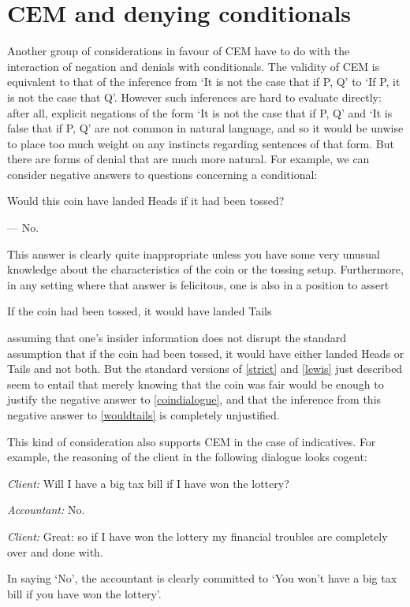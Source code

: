 \documentclass[If.tex]{subfiles}
\begin{document}
\section{CEM and denying conditionals}
Another group of considerations in favour of CEM have to do with the interaction of negation and denials with conditionals. The validity of CEM is equivalent to that of the inference from ‘It is not the case that if P, Q’ to ‘If P, it is not the case that Q’. However such inferences are hard to evaluate directly: after all, explicit negations of the form ‘It is not the case that if P, Q’ and ‘It is false that if P, Q’ are not common in natural language, and so it would be unwise to place too much weight on any instincts regarding sentences of that form. But there are forms of denial that are much more natural. For example, we can consider negative answers to questions concerning a conditional:
\begin{prop}
\nitem \label{coindialogue}
  \begin{prop}
      \item
		 Would this coin have landed Heads if it had been tossed?
		 \item
		 --- No.
  \end{prop}
\end{prop}
This answer is clearly quite inappropriate unless you have some very unusual knowledge about the characteristics of the coin or the tossing setup. Furthermore, in any setting where that answer is felicitous, one is also in a position to assert
\begin{prop}
\nitem \label{wouldtails}
  If the coin had been tossed, it would have landed Tails
\end{prop}
assuming that one's insider information does not disrupt the standard assumption that if the coin had been tossed, it would have either landed Heads or Tails and not both. But the standard versions of \ref{strict} and \ref{lewis} just described seem to entail that merely knowing that the coin was fair would be enough to justify the negative answer to \ref{coindialogue}, and that the inference from this negative answer to \ref{wouldtails} is completely unjustified.

This kind of consideration also supports CEM in the case of indicatives. For example, the reasoning of the client in the following dialogue looks cogent:
\begin{prop}
	\nitem \label{taxdialogue}
		\emph{Client:} Will I have a big tax bill if I have won the lottery?

		\emph{Accountant:} No.

		\emph{Client:} Great: so if I have won the lottery my financial
		troubles are completely over and done with.
\end{prop}
In saying ‘No’, the accountant is clearly committed to `You won't have a
big tax bill if you have won the lottery'.
\end{document}
